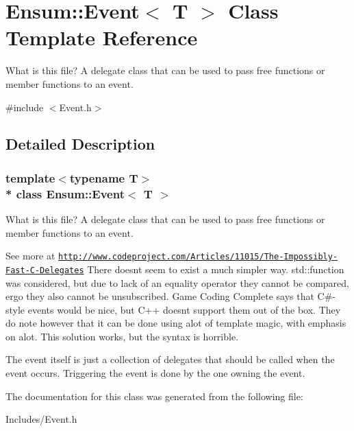 \hypertarget{class_ensum_1_1_event}{}\section{Ensum\+:\+:Event$<$ T $>$ Class Template Reference}
\label{class_ensum_1_1_event}


What is this file? A delegate class that can be used to pass free functions or member functions to an event.  




{\ttfamily \#include $<$Event.\+h$>$}



\subsection{Detailed Description}
\subsubsection*{template$<$typename T$>$\\*
class Ensum\+::\+Event$<$ T $>$}

What is this file? A delegate class that can be used to pass free functions or member functions to an event. 

See more at \href{http://www.codeproject.com/Articles/11015/The-Impossibly-Fast-C-Delegates}{\tt http\+://www.\+codeproject.\+com/\+Articles/11015/\+The-\/\+Impossibly-\/\+Fast-\/\+C-\/\+Delegates} There doesn\textquotesingle{}t seem to exist a much simpler way. std\+::function was considered, but due to lack of an equality operator they cannot be compared, ergo they also cannot be unsubscribed. Game Coding Complete says that C\#-\/style events would be nice, but C++ doesn\textquotesingle{}t support them out of the box. They do note however that it can be done using alot of template magic, with emphasis on alot. This solution works, but the syntax is horrible.

The event itself is just a collection of delegates that should be called when the event occurs. Triggering the event is done by the one owning the event. 

The documentation for this class was generated from the following file\+:\begin{DoxyCompactItemize}
\item 
Includes/Event.\+h\end{DoxyCompactItemize}
